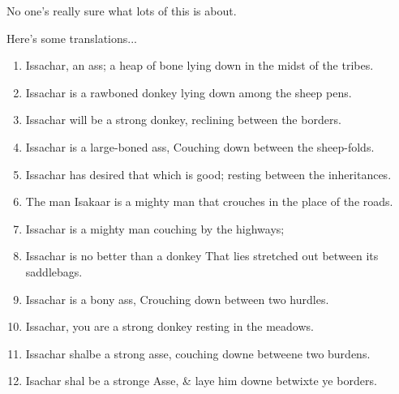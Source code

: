 {

}
{
}
{


	No one's really sure what lots of this is about.


	Here's some translations...

	\begin{enumerate}
	\item Issachar, an ass; a heap of bone lying down in the midst of the tribes.
	\item Issachar is a rawboned donkey lying down among the sheep pens.
	\item Issachar will be a strong donkey, reclining between the borders.
	\item Issachar is a large-boned ass, Couching down between the sheep-folds.
	\item Issachar has desired that which is good; resting between the inheritances.
	\item The man Isakaar is a mighty man that crouches in the place of the roads.
	\item Issachar is a mighty man couching by the highways;
	\item Issachar is no better than a donkey That lies stretched out between its saddlebags.
	\item Issachar is a bony ass, Crouching down between two hurdles.
	\item Issachar, you are a strong donkey resting in the meadows.
	\item Issachar shalbe a strong asse, couching downe betweene two burdens.
	\item Isachar shal be a stronge Asse, \& laye him downe betwixte ye borders.
	\end{enumerate}



}

